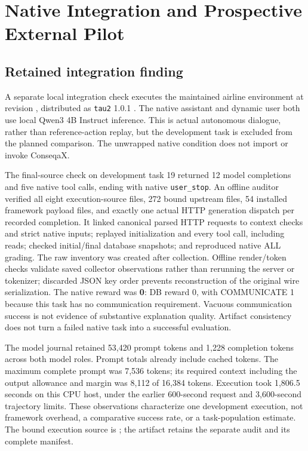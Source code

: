 \section{Native Integration and Prospective External Pilot}
\label{sec:native}

\subsection{Retained integration finding}

A separate local integration check executes the maintained airline environment at revision \texttt{}, distributed as \texttt{tau2} 1.0.1 \cite{tau3tasks,tau3eval}. The native assistant and dynamic user both use local Qwen3 4B Instruct inference. This is actual autonomous dialogue, rather than reference-action replay, but the development task is excluded from the planned comparison. The unwrapped native condition does not import or invoke ConseqaX.

The final-source check on development task 19 returned 12 model completions and five native tool calls, ending with native \texttt{user\_stop}. An offline auditor verified all eight execution-source files, 272 bound upstream files, 54 installed framework payload files, and exactly one actual HTTP generation dispatch per recorded completion. It linked canonical parsed HTTP requests to context checks and strict native inputs; replayed initialization and every tool call, including reads; checked initial/final database snapshots; and reproduced native ALL grading. The raw inventory was created after collection. Offline render/token checks validate saved collector observations rather than rerunning the server or tokenizer; discarded JSON key order prevents reconstruction of the original wire serialization. The native reward was \textbf{0}: DB reward 0, with COMMUNICATE 1 because this task has no communication requirement. Vacuous communication success is not evidence of substantive explanation quality. Artifact consistency does not turn a failed native task into a successful evaluation.

The model journal retained 53,420 prompt tokens and 1,228 completion tokens across both model roles. Prompt totals already include cached tokens. The maximum complete prompt was 7,536 tokens; its required context including the output allowance and margin was 8,112 of 16,384 tokens. Execution took 1,806.5 seconds on this CPU host, under the earlier 600-second request and 3,600-second trajectory limits. These observations characterize one development execution, not framework overhead, a comparative success rate, or a task-population estimate. The bound execution source is \texttt{}; the artifact retains the separate audit and its complete manifest.

